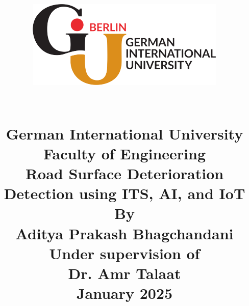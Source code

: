 \documentclass[11pt,a4paper]{report}
\title{
    \begin{minipage}{0.8\textwidth}
        \includegraphics[width=\textwidth]{figures/giu_logo.png}
    \end{minipage}
    \vspace{1cm}\\
   German International University
   \vspace{0.3cm}\\
   Faculty of Engineering
    \vspace{1cm} \\
    Road Surface Deterioration Detection using ITS, AI, and IoT \\
    \vspace{1cm}
    \textbf{By} \\
    Aditya Prakash Bhagchandani \\
    \vspace{1cm}
    \textbf{Under supervision of} \\
    Dr. Amr Talaat \\
    \vspace{1cm}
    January 2025
}
\author{}
\date{}
\begin{document}
\maketitle


%
%


\tableofcontents
\listoffigures




%

\renewcommand{\bibname}{References}


\appendix

\end{document}
